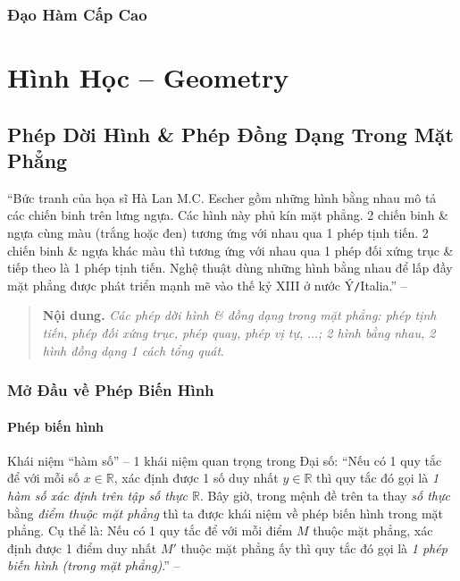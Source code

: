 \documentclass[oneside]{book}
\numberwithin{equation}{section}
\begin{document}

\section{Đạo Hàm Cấp Cao}


\part{Hình Học -- Geometry}

\chapter{Phép Dời Hình \& Phép Đồng Dạng Trong Mặt Phẳng}

``Bức tranh của họa sĩ Hà Lan M.C. Escher gồm những hình bằng nhau mô tả các chiến binh trên lưng ngựa. Các hình này phủ kín mặt phẳng. 2 chiến binh \& ngựa cùng màu (trắng hoặc đen) tương ứng với nhau qua 1 phép tịnh tiến. 2 chiến binh \& ngựa khác màu thì tương ứng với nhau qua 1 phép đối xứng trục \& tiếp theo là 1 phép tịnh tiến. Nghệ thuật dùng những hình bằng nhau để lấp đầy mặt phẳng được phát triển mạnh mẽ vào thế kỷ XIII ở nước Ý\texttt{/}Italia.'' -- \cite[p. 3]{SGK_Toan_11_hinh_hoc_nang_cao}

\begin{quotation}
	\textbf{Nội dung.} \textit{Các phép dời hình \& đồng dạng trong mặt phẳng: phép tịnh tiến, phép đối xứng trục, phép quay, phép vị tự, $\ldots$; 2 hình bằng nhau, 2 hình đồng dạng 1 cách tổng quát}.
\end{quotation}

\section{Mở Đầu về Phép Biến Hình}

\subsection{Phép biến hình}
Khái niệm ``hàm số'' -- 1 khái niệm quan trọng trong Đại số: ``Nếu có 1 quy tắc để với mỗi số $x\in\mathbb{R}$, xác định được 1 số duy nhất $y\in\mathbb{R}$ thì quy tắc đó gọi là \textit{1 hàm số xác định trên tập số thực $\mathbb{R}$}. Bây giờ, trong mệnh đề trên ta thay \textit{số thực} bằng \textit{điểm thuộc mặt phẳng} thì ta được khái niệm về phép biến hình trong mặt phẳng. Cụ thể là: Nếu có 1 quy tắc để với mỗi điểm $M$ thuộc mặt phẳng, xác định được 1 điểm duy nhất $M'$ thuộc mặt phẳng ấy thì quy tắc đó gọi là \textit{1 phép biến hình (trong mặt phẳng)}.'' -- \cite[p. 4]{SGK_Toan_11_hinh_hoc_nang_cao}
\end{document}
